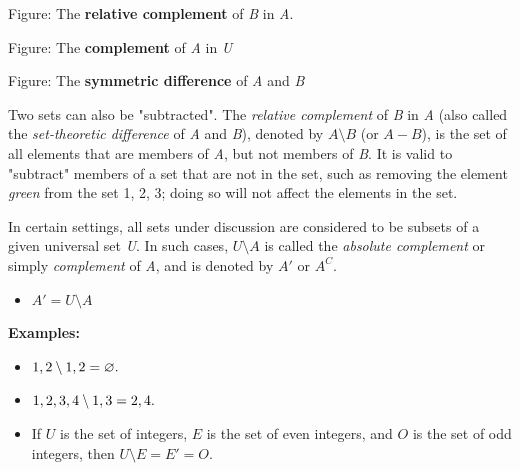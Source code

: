 


Figure: The \textbf{relative complement} of \textit{B} in \textit{A}.






Figure: The \textbf{complement} of \textit{A} in \textit{U}






Figure: The \textbf{symmetric difference} of \textit{A} and \textit{B}



Two sets can also be "subtracted". The \textit{relative complement} of \textit{B} in
\textit{A} (also called the \textit{set-theoretic difference} of \textit{A} and
\textit{B}), denoted by $A \setminus B$ (or $A - B$), is the set of all elements that are
members of \textit{A}, but not members of \textit{B}. It is valid to "subtract" members of
a set that are not in the set, such as removing the element \textit{green} from the set
{1, 2, 3}; doing so will not affect the elements in the set.



In certain settings, all sets under discussion are considered to be subsets of a given
universal set \textit{U}. In such cases, $U \setminus A$ is called the \textit{absolute
complement} or simply \textit{complement} of \textit{A}, and is denoted by $A'$ or $A^C$.



\begin{itemize}
    \item $A' = U \setminus A$
\end{itemize}

\textbf{Examples:}



\begin{itemize}
    \item $\\{1, 2\\} \setminus \\{1, 2\\} = \varnothing.$
    \item $\\{1, 2, 3, 4\\} \setminus \\{1, 3\\} = \\{2, 4\\}.$
    \item If $U$ is the set of integers, $E$ is the set of even integers, and $O$ is the set of odd integers, then $U \setminus E = E' = O.$
\end{itemize}

